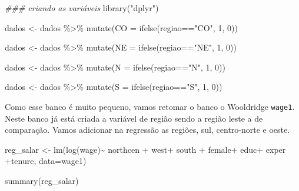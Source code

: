 \documentclass[
  letterpaper,
  DIV=11,
  numbers=noendperiod]{scrreprt}
\newenvironment{Shaded}{\begin{snugshade}}{\end{snugshade}}
\newcommand{\AttributeTok}[1]{\textcolor[rgb]{0.40,0.45,0.13}{#1}}
\newcommand{\DecValTok}[1]{\textcolor[rgb]{0.68,0.00,0.00}{#1}}
\newcommand{\DocumentationTok}[1]{\textcolor[rgb]{0.37,0.37,0.37}{\textit{#1}}}
\newcommand{\FunctionTok}[1]{\textcolor[rgb]{0.28,0.35,0.67}{#1}}
\newcommand{\NormalTok}[1]{\textcolor[rgb]{0.00,0.23,0.31}{#1}}
\newcommand{\OtherTok}[1]{\textcolor[rgb]{0.00,0.23,0.31}{#1}}
\newcommand{\SpecialCharTok}[1]{\textcolor[rgb]{0.37,0.37,0.37}{#1}}
\newcommand{\StringTok}[1]{\textcolor[rgb]{0.13,0.47,0.30}{#1}}
\begin{document}
\begin{Shaded}
\begin{Highlighting}[]
\DocumentationTok{\#\#\# criando as variáveis}
\FunctionTok{library}\NormalTok{(}\StringTok{"dplyr"}\NormalTok{)}

\NormalTok{dados }\OtherTok{\textless{}{-}}\NormalTok{ dados }\SpecialCharTok{\%\textgreater{}\%}
  \FunctionTok{mutate}\NormalTok{(}\AttributeTok{CO =} \FunctionTok{ifelse}\NormalTok{(regiao}\SpecialCharTok{==}\StringTok{"CO"}\NormalTok{, }\DecValTok{1}\NormalTok{, }\DecValTok{0}\NormalTok{))}

\NormalTok{dados }\OtherTok{\textless{}{-}}\NormalTok{ dados }\SpecialCharTok{\%\textgreater{}\%}
  \FunctionTok{mutate}\NormalTok{(}\AttributeTok{NE =} \FunctionTok{ifelse}\NormalTok{(regiao}\SpecialCharTok{==}\StringTok{"NE"}\NormalTok{, }\DecValTok{1}\NormalTok{, }\DecValTok{0}\NormalTok{))}

\NormalTok{dados }\OtherTok{\textless{}{-}}\NormalTok{ dados }\SpecialCharTok{\%\textgreater{}\%}
  \FunctionTok{mutate}\NormalTok{(}\AttributeTok{N =} \FunctionTok{ifelse}\NormalTok{(regiao}\SpecialCharTok{==}\StringTok{"N"}\NormalTok{, }\DecValTok{1}\NormalTok{, }\DecValTok{0}\NormalTok{))}

\NormalTok{dados }\OtherTok{\textless{}{-}}\NormalTok{ dados }\SpecialCharTok{\%\textgreater{}\%}
  \FunctionTok{mutate}\NormalTok{(}\AttributeTok{S =} \FunctionTok{ifelse}\NormalTok{(regiao}\SpecialCharTok{==}\StringTok{"S"}\NormalTok{, }\DecValTok{1}\NormalTok{, }\DecValTok{0}\NormalTok{))}
\end{Highlighting}
\end{Shaded}

Como esse banco é muito pequeno, vamos retomar o banco o Wooldridge
\texttt{wage1}. Neste banco já está criada a variável de região sendo a
região leste a de comparação. Vamos adicionar na regressão as regiões,
sul, centro-norte e oeste.

\begin{Shaded}
\begin{Highlighting}[]
\NormalTok{reg\_salar }\OtherTok{\textless{}{-}} \FunctionTok{lm}\NormalTok{(}\FunctionTok{log}\NormalTok{(wage)}\SpecialCharTok{\textasciitilde{}}\NormalTok{  northcen }\SpecialCharTok{+}\NormalTok{ west}\SpecialCharTok{+}\NormalTok{ south }\SpecialCharTok{+}\NormalTok{ female}\SpecialCharTok{+}\NormalTok{ educ}\SpecialCharTok{+}\NormalTok{ exper }\SpecialCharTok{+}\NormalTok{tenure, }\AttributeTok{data=}\NormalTok{wage1)}

\FunctionTok{summary}\NormalTok{(reg\_salar)}
\end{Highlighting}
\end{Shaded}
\end{document}
